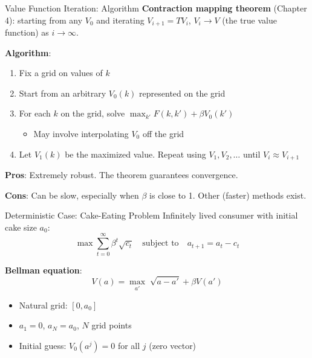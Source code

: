 \documentclass[blue]{beamer}
\begin{document}
\begin{frame}{Value Function Iteration: Algorithm}
	\textbf{Contraction mapping theorem} (Chapter 4): starting from any $V_0$ and iterating $V_{i+1} = T V_i$, $V_i \to V$ (the true value function) as $i \to \infty$.
	
	\textbf{Algorithm}:
	\begin{enumerate}
		\item Fix a grid on values of $k$
		\item Start from an arbitrary $V_0(k)$ represented on the grid
		\item For each $k$ on the grid, solve $\max_{k'} F(k, k') + \beta V_0(k')$
		\begin{itemize}
			\item May involve interpolating $V_0$ off the grid
		\end{itemize}
		\item Let $V_1(k)$ be the maximized value. Repeat using $V_1, V_2, \ldots$ until $V_i \approx V_{i+1}$
	\end{enumerate}
	
	\textbf{Pros}: Extremely robust. The theorem guarantees convergence.
	
	\textbf{Cons}: Can be slow, especially when $\beta$ is close to 1. Other (faster) methods exist.
\end{frame}

\begin{frame}{Deterministic Case: Cake-Eating Problem}
	Infinitely lived consumer with initial cake size $a_0$:
	\[
	\max \sum_{t=0}^\infty \beta^t \sqrt{c_t} \quad \text{subject to} \quad a_{t+1} = a_t - c_t
	\]
	
	\bigskip
	\textbf{Bellman equation}:
	\[
	V(a) = \max_{a'}\; \sqrt{a - a'} + \beta V(a')
	\]
	
	\bigskip
	\begin{itemize}
		\item Natural grid: $[0, a_0]$
		\item $a_1 = 0$, $a_N = a_0$, $N$ grid points
		\item Initial guess: $V_0(a^j) = 0$ for all $j$ (zero vector)
	\end{itemize}
\end{frame}
\end{document}
